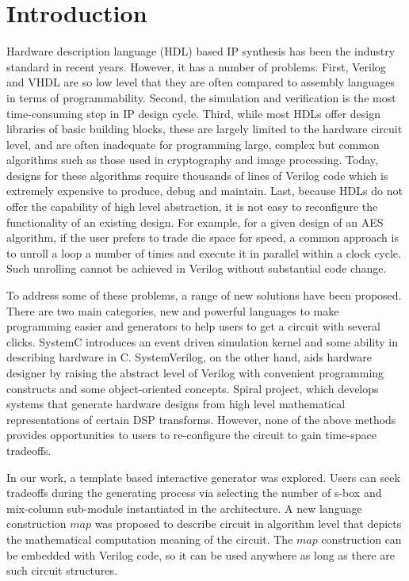 \section{Introduction}\label{sec:intro}
Hardware description language (HDL)\cite{intro:HDL} based IP synthesis has been the
industry standard in recent years.
However, it has a number of problems.
First, Verilog and VHDL are so low level that they are often compared to assembly languages
in terms of programmability.
Second, the simulation and verification
is the most time-consuming step in IP design cycle. Third, while most HDLs offer design libraries of basic building blocks,
these are largely limited to the hardware circuit level, and are often inadequate for programming
large, complex but common algorithms such as those used in cryptography and image processing.
Today, designs for these algorithms require thousands of lines of Verilog code which is
extremely expensive to produce, debug and maintain. Last, because HDLs do not offer the
capability of high level abstraction, it is not easy to reconfigure the functionality of an
existing design. For example, for a given design of an AES algorithm, if the user prefers
to trade die space for speed, a common approach is to unroll a loop a number of times
and execute it in parallel within a clock cycle. Such unrolling cannot be achieved
in Verilog without substantial code change.

To address some of these problems, a range of new solutions have been
proposed. There are two main categories, new and powerful languages to make programming easier and generators to help users to get a circuit with several clicks. SystemC\cite{Grotker-sysC} introduces an event driven simulation kernel and some ability in describing hardware in C. SystemVerilog\cite{Sutherland-systemverilog}, on the other hand, aids hardware designer by raising the abstract level of Verilog with convenient programming constructs and some object-oriented concepts. Spiral\cite{NordinMHP05:Spiral}\cite{SpiralProject} project, which develops systems that generate hardware designs from high level mathematical representations of certain DSP transforms. However, none of the above methods provides
opportunities to users to re-configure 
the circuit to gain time-space tradeoffs.

In our work, a template based interactive generator was explored. Users can seek tradeoffs during the generating process via selecting the number of s-box and mix-column sub-module instantiated in the architecture. 
A new language construction $map$ was proposed to describe circuit in algorithm level that depicts the mathematical computation meaning of the circuit. The $map$ construction can be embedded with Verilog code, so it can be used anywhere as long as there are such circuit structures.
